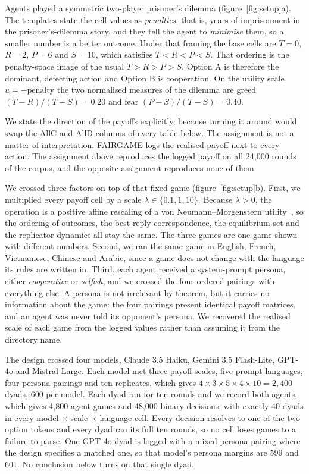 \documentclass[11pt,a4paper]{article}
\newcommand{\lam}{\lambda}
\begin{document}
Agents played a symmetric two-player prisoner's dilemma
(figure~\ref{fig:setup}a). The templates state the cell values as
\emph{penalties}, that is, years of imprisonment in the prisoner's-dilemma
story, and they tell the agent to \emph{minimise} them, so a smaller number is a
better outcome. Under that framing the base cells are $T = 0$, $R = 2$, $P = 6$
and $S = 10$, which satisfies $T < R < P < S$. That ordering is the
penalty-space image of the usual $T > R > P > S$. Option A is therefore the
dominant, defecting action and Option B is cooperation. On the utility scale
$u = -\text{penalty}$ the two normalised measures of the dilemma are greed
$(T-R)/(T-S) = 0.20$ and fear $(P-S)/(T-S) = 0.40$.

We state the direction of the payoffs explicitly, because turning it around
would swap the AllC and AllD columns of every table below. The assignment is
not a matter of interpretation. FAIRGAME logs the realised payoff next to
every action. The assignment above reproduces the logged payoff on all
24{,}000 rounds of the corpus, and the opposite assignment reproduces none of
them.

We crossed three factors on top of that fixed game (figure~\ref{fig:setup}b).
First, we multiplied every payoff cell by a scale $\lam \in \{0.1, 1, 10\}$.
Because $\lam > 0$, the operation is a positive affine rescaling of a von
Neumann--Morgenstern utility~\citep{vonneumann1944theory,luce1957games}, so
the ordering of outcomes, the best-reply correspondence, the equilibrium set
and the replicator dynamics all stay the same. The three games are one game
shown with different numbers. Second, we ran the same game in English, French,
Vietnamese, Chinese and Arabic, since a game does not change with the language
its rules are written in. Third, each agent received a system-prompt persona,
either \emph{cooperative} or \emph{selfish}, and we crossed the four ordered
pairings with everything else. A persona is not irrelevant by theorem, but it
carries no information about the game: the four pairings present identical
payoff matrices, and an agent was never told its opponent's persona. We
recovered the realised scale of each game from the logged values rather than
assuming it from the directory name.

The design crossed four models, Claude 3.5 Haiku, Gemini 3.5 Flash-Lite,
GPT-4o and Mistral Large. Each model met three payoff scales, five prompt
languages, four persona pairings and ten replicates, which gives
$4 \times 3 \times 5 \times 4 \times 10 = 2{,}400$ dyads, 600 per model. Each dyad ran for ten rounds and we record
both agents, which gives 4{,}800 agent-games and 48{,}000 binary decisions,
with exactly 40 dyads in every model $\times$ scale $\times$ language cell.
Every decision resolves to one of the two option tokens and every dyad ran its
full ten rounds, so no cell loses games to a failure to parse. One GPT-4o dyad
is logged with a mixed persona pairing where the design specifies a matched
one, so that model's persona margins are 599 and 601. No conclusion below
turns on that single dyad.
\end{document}
